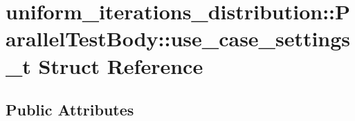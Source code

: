 \hypertarget{structuniform__iterations__distribution_1_1ParallelTestBody_1_1use__case__settings__t}{}\section{uniform\+\_\+iterations\+\_\+distribution\+:\+:Parallel\+Test\+Body\+:\+:use\+\_\+case\+\_\+settings\+\_\+t Struct Reference}
\label{structuniform__iterations__distribution_1_1ParallelTestBody_1_1use__case__settings__t}
\subsection*{Public Attributes}
